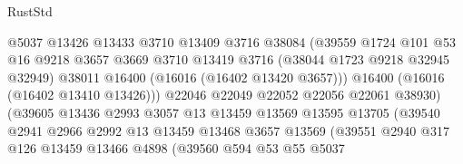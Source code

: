 \begin{lexlean}{RustStd}
\begin{coremodule}
                                    @5037
                                    @13426
                                    @13433
                                    @3710
                                    @13409
                                    @3716
                                    @38084
                                    (@39559
                                      @1724
                                      @101
                                      @53
                                      @16
                                      @9218
                                      @3657
                                      @3669
                                      @3710
                                      @13419
                                      @3716
                                      (@38044 @1723 @9218 @32945 @32949)
                                      @38011
                                      @16400
                                      (@16016 (@16402 @13420 @3657)))
                                    @16400
                                    (@16016 (@16402 @13410 @13426)))
                                  @22046
                                  @22049
                                  @22052
                                  @22056
                                  @22061
                                  @38930)
                                (@39605
                                  @13436
                                  @2993
                                  @3057
                                  @13
                                  @13459
                                  @13569
                                  @13595
                                  @13705
                                  (@39540
                                    @2941
                                    @2966
                                    @2992
                                    @13
                                    @13459
                                    @13468
                                    @3657
                                    @13569
                                    (@39551
                                      @2940
                                      @317
                                      @126
                                      @13459
                                      @13466
                                      @4898
                                      (@39560
                                        @594
                                        @53
                                        @55
                                        @5037

\end{coremodule}
\end{lexlean}
